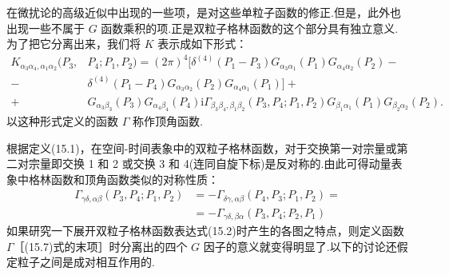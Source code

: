 在微扰论的高级近似中出现的一些项，是对这些单粒子函数的修正.但是，此外也出现一些不属于 $G$ 函数乘积的项.正是双粒子格林函数的这个部分具有独立意义.为了把它分离出来，我们将 $K$ 表示成如下形式：
\begin{equation}
\begin{aligned}
  K_{\alpha_3\alpha_4,\alpha_1\alpha_2}(P_3,&P_4;P_1,P_2)=(2\pi)^4[\delta^{(4)}(P_1-P_3)G_{\alpha_3\alpha_1}(P_1)G_{\alpha_4\alpha_2}(P_2)-\\
  -&\delta^{(4)}(P_1-P_4)G_{\alpha_3\alpha_2}(P_2)G_{\alpha_4\alpha_1}(P_1)]+\\
  +&G_{\alpha_3\beta_3}(P_3)G_{\alpha_4\beta_4}(P_4)\mathrm{i}\Gamma_{\beta_3\beta_4,\beta_1\beta_2}(P_3,P_4;P_1,P_2)G_{\beta_1\alpha_1}(P_1)G_{\beta_2\alpha_2}(P_2).
\end{aligned}
\end{equation}
以这种形式定义的函数 $\Gamma$ 称作顶角函数.

根据定义(15.1)，在空间-时间表象中的双粒子格林函数，对于交换第一对宗量或第二对宗量即交换 1 和 2 或交换 3 和 4(连同自旋下标)是反对称的.由此可得动量表象中格林函数和顶角函数类似的对称性质：
\begin{equation}
\begin{aligned}
  \Gamma_{\gamma\delta,\alpha\beta}(P_3,P_4;P_1,P_2)&=-\Gamma_{\delta\gamma,\alpha\beta}(P_4,P_3;P_1,P_2)=\\
  &=-\Gamma_{\gamma\delta,\beta\alpha}(P_3,P_4;P_2,P_1)
\end{aligned}
\end{equation}
如果研究一下展开双粒子格林函数表达式(15.2)时产生的各图之特点，则定义函数 $\Gamma$［(15.7)式的末项］时分离出的四个 $G$ 因子的意义就变得明显了.以下的讨论还假定粒子之间是成对相互作用的.


